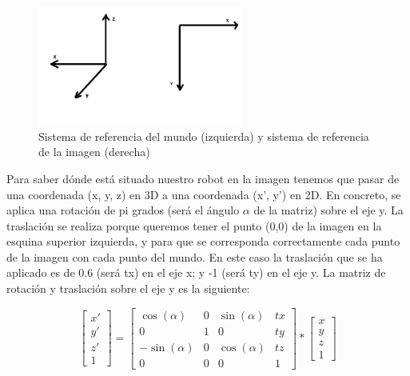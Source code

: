 \begin{figure}[H]
  \begin{center}
    \includegraphics[width=0.6\textwidth]{figures/Vacuum/SistemaRef_world_image.png}
		\caption{Sistema de referencia del mundo (izquierda) y sistema de referencia de la imagen (derecha)}
		\label{fig.sistemaref_world}
		\end{center}
\end{figure}

Para saber dónde está situado nuestro robot en la imagen tenemos que pasar de una coordenada (x, y, z) en 3D a una coordenada (x’, y’) en 2D. En concreto, se aplica una rotación de pi grados (será el ángulo \(\alpha\) de la matriz) sobre el eje y. La traslación se realiza porque queremos tener el punto (0,0) de la imagen en la esquina superior izquierda, y para que se corresponda correctamente cada punto de la imagen con cada punto del mundo. En este caso la traslación que se ha aplicado es de 0.6 (será tx) en el eje x; y -1 (será ty) en el eje y. La matriz de rotación y traslación sobre el eje y es la siguiente:


\begin{equation}
\left[\begin{array}{cc}
x' \\ 
y' \\
z' \\
1
\end{array}\right] = \left[\begin{array}{cccc}
\cos(\alpha) & 0 & \sin(\alpha) & tx \\ 
0 & 1 & 0 & ty\\
-\sin(\alpha) & 0 & \cos(\alpha) & tz \\
0 & 0 & 0 & 1
\end{array}\right]* \left[\begin{array}{cc}
x \\ 
y \\
z \\
1
\end{array}\right]
\end{equation}
\\

